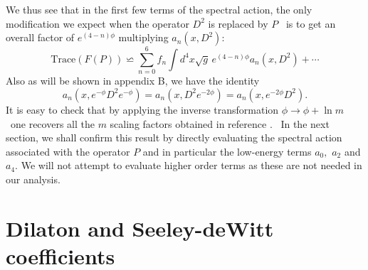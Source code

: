 \documentclass[12pt]{article}%
\begin{document}
We thus see that in the first few terms of the spectral action, the only
modification we expect when the operator $D^{2}$ is replaced by $P$ \ is to
get an overall factor of $e^{\left(  4-n\right)  \phi}$ multiplying
$a_{n}\left(  x,D^{2}\right)  :$%
\[
\mathrm{Trace}(F(P))\backsimeq%
{\displaystyle\sum\limits_{n=0}^{6}}
f_{n}%
{\displaystyle\int}
d^{4}x\sqrt{g}\,e^{\left(  4-n\right)  \phi}a_{n}(x,D^{2})+\cdots
\]
Also as will be shown in appendix B, we have the identity
\[
a_{n}(x,e^{-\phi}D^{2}e^{-\phi})=a_{n}\left(  x,D^{2}e^{-2\phi}\right)
=a_{n}(x,e^{-2\phi}D^{2}).
\]
It is easy to check that by applying the inverse transformation $\phi
\rightarrow\phi+\ln m$ \ one recovers all the $m$ scaling factors obtained in
reference \cite{ACAC}. \ In the next section, we shall confirm this result by
directly evaluating the spectral action associated with the operator $P$ and
in particular the low-energy terms $a_{0},$ $a_{2}$ and $a_{4}.$ We will not
attempt to evaluate higher order terms as these are not needed in our analysis.

\section{\bigskip Dilaton and Seeley-deWitt coefficients}

\label{seeleydewitt}
\end{document}
